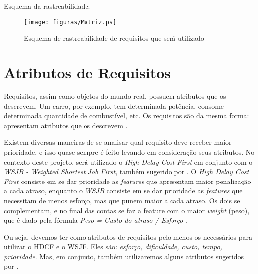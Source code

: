 \newpage
Esquema da rastreabilidade:

\begin{figure}[h]
  \centering
  \caption{Esquema de rastreabilidade de requisitos que será utilizado}
  \texttt{[image: figuras/Matriz.ps]}
\end{figure}

\section{Atributos de Requisitos}
Requisitos, assim como objetos do mundo real, possuem atributos que os descrevem. Um carro, por exemplo, tem determinada potência, consome determinada quantidade de combustível, etc. Os requisitos são da mesma forma: apresentam atributos que os descrevem \cite{tel006}.

Existem diversas maneiras de se analisar qual requisito deve receber maior prioridade, e isso quase sempre é feito levando em consideração seus atributos. No contexto deste projeto, será utilizado o \emph{High Delay Cost First} em conjunto com o \emph{WSJB - Weighted Shortest Job First}, também sugerido por \cite{safe001}. O \emph{High Delay Cost First} consiste em se dar prioridade as \emph{features} que apresentam maior penalização a cada atraso, enquanto o \emph{WSJB} consiste em se dar prioridade as \emph{features} que necessitam de menos esforço, mas que punem maior a cada atraso. Os dois se complementam, e no final das contas se faz a feature com o maior \emph{weight} (peso), que é dado pela fórmula \emph{Peso = Custo do atraso / Esforço} \cite[p. 266]{safe001}.

Ou seja, devemos ter como atributos de requisitos pelo menos os necessários para utilizar o HDCF e o WSJF. Eles são: \emph{esforço, dificuldade, custo, tempo, prioridade}. Mas, em conjunto, também utilizaremos alguns atributos sugeridos por \cite{tel006}.


